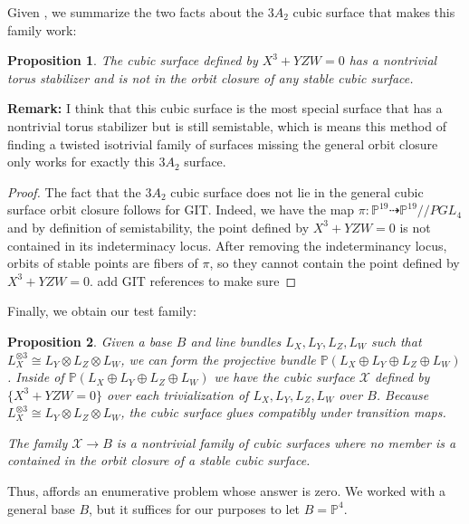 \documentclass[12 pt]{amsart}
\newtheorem{proposition}{Proposition}[section]
\newenvironment{remark}{\textbf{Remark:}}{}
\newcommand{\<}{\left\langle}
\renewcommand{\>}{\right\rangle}
\begin{document}
Given , we summarize the two facts about the $3A_2$ cubic surface that makes this family work:
\begin{proposition}
\label{prop:twofacts}
The cubic surface defined by $X^3 + YZW = 0$ has a nontrivial torus stabilizer and is not in the orbit closure of any stable cubic surface.
\end{proposition}

\begin{remark}
I think that this cubic surface is the most special surface that has a nontrivial torus stabilizer but is still semistable, which is means this method of finding a twisted isotrivial family of surfaces missing the general orbit closure only works for exactly this $3A_2$ surface. 
\end{remark}

\begin{proof}
The fact that the $3A_2$ cubic surface does not lie in the general cubic surface orbit closure follows for GIT. Indeed, we have the map $\pi: \mathbb{P}^{19}\dashrightarrow \mathbb{P}^{19}//PGL_4$ and by definition of semistability, the point defined by $X^3 + YZW = 0$ is not contained in its indeterminacy locus. After removing the indeterminancy locus, orbits of stable points are fibers of $\pi$, so they cannot contain the point defined by $X^3 + YZW = 0$. {\color{red} add GIT references to make sure}
\end{proof}

Finally, we obtain our test family:
\begin{proposition}
\label{prop:isotrivialfamily}
Given a base $B$ and line bundles $L_X, L_Y, L_Z, L_W$ such that $L_X^{\otimes 3}\cong L_Y\otimes L_Z\otimes L_W$, we can form the projective bundle $\mathbb{P}(L_X\oplus L_Y\oplus L_Z\oplus L_W)$. Inside of $\mathbb{P}(L_X\oplus L_Y\oplus L_Z\oplus L_W)$ we have the cubic surface $\mathcal{X}$ defined by $\{X^3 + YZW = 0\}$ over each trivialization of $L_X, L_Y, L_Z, L_W$ over $B$. Because $L_X^{\otimes 3}\cong L_Y\otimes L_Z\otimes L_W$, the cubic surface glues compatibly under transition maps.

The family $\mathcal{X}\to B$ is a nontrivial family of cubic surfaces where no member is a contained in the orbit closure of a stable cubic surface.
\end{proposition}

Thus,  affords an enumerative problem whose answer is zero. We worked with a general base $B$, but it suffices for our purposes to let $B=\mathbb{P}^4$. 
\end{document}
